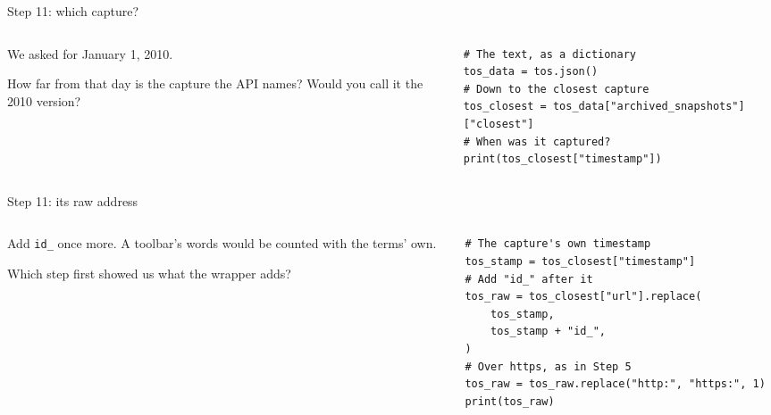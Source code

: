 \documentclass[9pt,aspectratio=169]{beamer}
\begin{document}
\begin{frame}[fragile]{Step 11: which capture?}
    \begin{columns}[T]
        \begin{column}{0.37\textwidth}
            We asked for January 1, 2010.

            \medskip
            How far from that day is the capture the API names? Would you call it the 2010 version?
        \end{column}
        \begin{column}{0.6\textwidth}
\begin{lstlisting}
# The text, as a dictionary
tos_data = tos.json()
# Down to the closest capture
tos_closest = tos_data["archived_snapshots"]["closest"]
# When was it captured?
print(tos_closest["timestamp"])
\end{lstlisting}
        \end{column}
    \end{columns}
\end{frame}

\begin{frame}[fragile]{Step 11: its raw address}
    \begin{columns}[T]
        \begin{column}{0.37\textwidth}
            Add \texttt{id\_} once more. A toolbar's words would be counted with the terms' own.

            \medskip
            Which step first showed us what the wrapper adds?
        \end{column}
        \begin{column}{0.6\textwidth}
\begin{lstlisting}
# The capture's own timestamp
tos_stamp = tos_closest["timestamp"]
# Add "id_" after it
tos_raw = tos_closest["url"].replace(
    tos_stamp,
    tos_stamp + "id_",
)
# Over https, as in Step 5
tos_raw = tos_raw.replace("http:", "https:", 1)
print(tos_raw)
\end{lstlisting}
        \end{column}
    \end{columns}
\end{frame}
\end{document}
